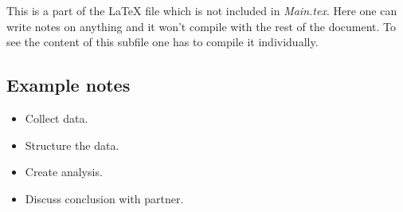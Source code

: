 \documentclass[../Main.tex]{subfiles}
\begin{document}
This is a part of the \LaTeX{} file which is not included in \textit{Main.tex}. Here one can write notes on anything and it won't compile with the rest of the document. To see the content of this subfile one has to compile it individually.

\subsection{Example notes}
\begin{itemize}
    \item Collect data.
    \item Structure the data.
    \item Create analysis.
    \item Discuss conclusion with partner.
\end{itemize}

\biblio %
\end{document}
